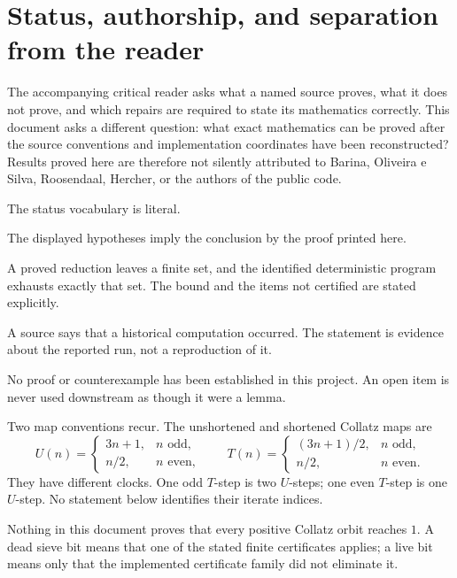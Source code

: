 \section{Status, authorship, and separation from the reader}

The accompanying critical reader asks what a named source proves, what it
does not prove, and which repairs are required to state its mathematics
correctly.  This document asks a different question: what exact mathematics
can be proved after the source conventions and implementation coordinates have
been reconstructed?  Results proved here are therefore not silently
attributed to Barina, Oliveira e Silva, Roosendaal, Hercher, or the authors of
the public code.

The status vocabulary is literal.

\begin{description}[leftmargin=3.4cm,style=nextline]
\item[Proved.] The displayed hypotheses imply the conclusion by the proof
printed here.
\item[Finite certificate.] A proved reduction leaves a finite set, and the
identified deterministic program exhausts exactly that set.  The bound and
the items not certified are stated explicitly.
\item[Source report.] A source says that a historical computation occurred.
The statement is evidence about the reported run, not a reproduction of it.
\item[Open.] No proof or counterexample has been established in this project.
An open item is never used downstream as though it were a lemma.
\end{description}

Two map conventions recur.  The unshortened and shortened Collatz maps are
\[
 U(n)=\begin{cases}3n+1,&n\text{ odd},\\n/2,&n\text{ even},\end{cases}
 \qquad
 T(n)=\begin{cases}(3n+1)/2,&n\text{ odd},\\n/2,&n\text{ even}.
 \end{cases}
\]
They have different clocks.  One odd $T$-step is two $U$-steps; one even
$T$-step is one $U$-step.  No statement below identifies their iterate
indices.

\begin{nonclaim}
Nothing in this document proves that every positive Collatz orbit reaches
$1$.  A dead sieve bit means that one of the stated finite certificates
applies; a live bit means only that the implemented certificate family did not
eliminate it.
\end{nonclaim}

